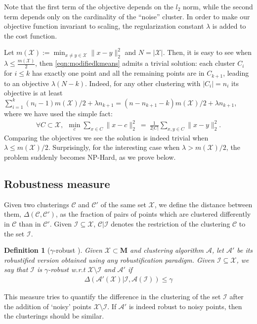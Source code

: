 \documentclass[12pt]{article}
\newcommand{\mc}{\mathcal}
\newcommand{\mb}{\mathbf}
\newtheorem{definition}[theorem]{Definition}
\begin{document}
Note that the first term of the objective depends on the $l_2$ norm, while the second term depends only on the cardinality of the ``noise'' cluster. In order to make our objective function invariant to scaling, the regularization constant $\lambda$ is added to the cost function. 

Let $m(\mc X) := \min_{x\ne y \in \mc X} \|x-y\|_2^2$ and $N = |\mc X|$. Then, it is easy to see when $\lambda \leq \frac{m(\mc X)}{2}$, then \eqref{eqn:modifiedkmeans} admits a trivial solution: each cluster $C_i$ for $i \leq k$ has exactly one point and all the remaining points are in $C_{k+1}$, leading to an objective $\lambda (N-k)$. Indeed, for any other clustering with $|C_i| = n_i$ its objective is at least $\sum_{i=1}^k (n_i-1) m(\mc X)/2 + \lambda n_{k+1} = (n-n_{k+1} - k) m(\mc X)/2 + \lambda n_{k+1}$, where we have used the simple fact:
\begin{align}
\forall C \subset \mc X, ~~
\min_{c} \sum_{x \in C} \|x - c\|_2^2 ~=~ \frac{1}{2|C|}\sum_{x, y \in C} \|x - y\|_2^2.
\end{align}
Comparing the objectives we see the solution is indeed trivial when $\lambda \leq m(\mc X) /2$. Surprisingly, for the interesting case when $\lambda > m(\mc X) /2$, the problem suddenly becomes NP-Hard, as we prove below.

\subsection{Robustness measure}
Given two clusterings $\mc C$ and $\mc C'$ of the same set $\mc X$, we define the distance between them, $\Delta(\mc C, \mc C')$, as the fraction of pairs of points which are clustered differently in $\mc C$ than in $\mc C'$. %
Given $\mc I \subseteq \mc X$, $\mc C|\mc I$ denotes the restriction of the clustering $\mc C$ to the set $\mc I$.

\begin{definition}[$\gamma$-robust \cite{ben2014clustering}]
Given $\mc X\subset \mb M$ and clustering algorithm $\mc A$, let $\mc A'$ be its robustified version obtained using any robustification paradigm. Given $\mc I \subseteq \mc X$, we say that $\mc I$ is $\gamma$-robust w.r.t $\mc X \setminus \mc I$ and $\mc A'$ if 
\begin{align}
\Delta(\mc A'(\mc X)|\mc I, \mc A(\mc I)) \le \gamma
\end{align}
\end{definition}
This measure tries to quantify the difference in the clustering of the set $\mc I$ after the addition of `noisy' points $\mc X \setminus \mc I$. If $\mc A'$ is indeed robust to noisy points, then the clusterings should be similar. 
\end{document}
